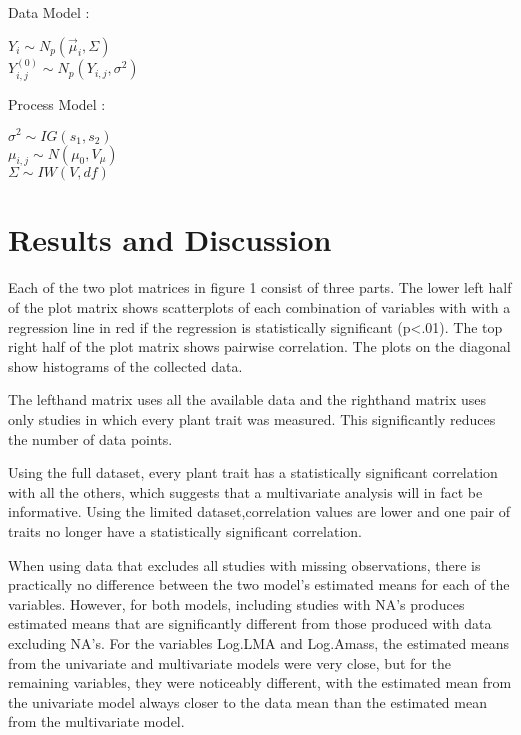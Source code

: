 \documentclass[12pt,fleqn]{article}
\theoremstyle{definition}
\theoremstyle{remark}
\theoremstyle{definition}
\begin{document}
\noindent Data Model :\\
\begin{linenomath*}
$Y_i \sim N_p(\vec{\mu}_i, \Sigma) $\\
$Y^{(0)}_{i,j} \sim N_p(Y_{i,j}, \sigma^2)$\\
 \end{linenomath*}
 

\noindent Process Model :\\
\begin{linenomath*}
$\sigma^2 \sim IG(s_1,s_2)$\\
$\mu_{i,j} \sim N(\mu_0, V_\mu)$\\
$\Sigma \sim IW(V, df)$ \\
 \end{linenomath*}


\section{Results and Discussion}

Each of the two plot matrices in figure 1 consist of three parts. The lower left half of the plot matrix shows scatterplots of each combination of variables with with a regression line in red if the regression is statistically significant (p<.01). The top right half of the plot matrix shows pairwise correlation. The plots on the diagonal show histograms of the collected data. 

The lefthand matrix uses all the available data and the righthand matrix uses only studies in which every plant trait was measured. This significantly reduces the number of data points. 

Using the full dataset, every plant trait has a statistically significant correlation with all the others, which suggests that a multivariate analysis will in fact be informative. Using the limited dataset,correlation values are lower and one pair of traits no longer have a statistically significant correlation. 


When using data that excludes all studies with missing observations, there is practically no difference between the two model’s estimated means for each of the variables. However, for both models, including studies with NA’s produces estimated means that are significantly different from those produced with data excluding NA’s. For the variables Log.LMA and Log.Amass, the estimated means from the univariate and multivariate models were very close, but for the remaining variables, they were noticeably different, with the estimated mean from the univariate model always closer to the data mean than the estimated mean from the multivariate model.
\end{document}
